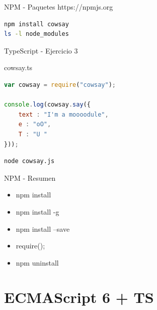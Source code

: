 \documentclass[aspectratio=169]{beamer}
\begin{document}
\begin{frame}[fragile]{NPM - Paquetes}
    https://npmjs.org
\begin{lstlisting}[language=bash]
npm install cowsay
ls -l node_modules
\end{lstlisting}
\end{frame}

\begin{frame}[fragile]{TypeScript - Ejercicio 3}
    
cowsay.ts
\begin{lstlisting}[language=JavaScript]
var cowsay = require("cowsay");

console.log(cowsay.say({
    text : "I'm a moooodule",
    e : "oO",
    T : "U "
}));
\end{lstlisting}

\begin{lstlisting}[language=bash]
node cowsay.js
\end{lstlisting}
    
\end{frame}

\begin{frame}[fragile]{NPM - Resumen}
    \begin{itemize}
        \item npm install
        \item npm install -g
        \item npm install --save
        \item require();
        \item npm uninstall
    \end{itemize}
\end{frame}


{
    \section{ECMAScript 6 + TS}
}
\end{document}
